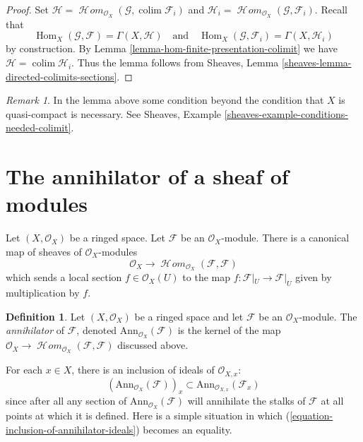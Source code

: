 \documentclass{stacks-project}
\theoremstyle{plain}
\theoremstyle{definition}
\newtheorem{definition}[subsection]{Definition}
\theoremstyle{remark}
\newtheorem{remark}[subsection]{Remark}
\numberwithin{equation}{subsection}
\def\colim{\mathop{\mathrm{colim}}\nolimits}
\def\Hom{\mathop{\mathrm{Hom}}\nolimits}
\def\SheafHom{\mathop{\mathcal{H}\!\mathit{om}}\nolimits}
\begin{document}
\begin{proof}
Set
$\mathcal{H} = \SheafHom_{\mathcal{O}_X}(\mathcal{G}, \colim \mathcal{F}_i)$
and $\mathcal{H}_i = \SheafHom_{\mathcal{O}_X}(\mathcal{G}, \mathcal{F}_i)$.
Recall that
$$
\Hom_X(\mathcal{G}, \mathcal{F}) = \Gamma(X, \mathcal{H})
\quad\text{and}\quad
\Hom_X(\mathcal{G}, \mathcal{F}_i) = \Gamma(X, \mathcal{H}_i)
$$
by construction. By Lemma \ref{lemma-hom-finite-presentation-colimit} we have
$\mathcal{H} = \colim \mathcal{H}_i$. Thus the lemma follows from
Sheaves, Lemma \ref{sheaves-lemma-directed-colimits-sections}.
\end{proof}

\begin{remark}
\label{remark-condition-necessary}
In the lemma above some condition beyond the condition that $X$
is quasi-compact is necessary. See
Sheaves, Example \ref{sheaves-example-conditions-needed-colimit}.
\end{remark}




\section{The annihilator of a sheaf of modules}
\label{section-annihilator}

\noindent
Let $(X, \mathcal{O}_X)$ be a ringed space.
Let $\mathcal{F}$ be an $\mathcal{O}_X$-module.
There is a canonical map of sheaves of $\mathcal{O}_X$-modules
$$
\mathcal{O}_X
\longrightarrow
\SheafHom_{\mathcal{O}_X}(\mathcal{F}, \mathcal{F})
$$
which sends a local section $f \in \mathcal{O}_X(U)$ to the map
$f : \mathcal{F}|_U \to \mathcal{F}|_U$ given by multiplication by $f$.

\begin{definition}
\label{definition-annihilator-sheaf}
Let $(X, \mathcal{O}_X)$ be a ringed space and let $\mathcal{F}$
be an $\mathcal{O}_X$-module. The {\it annihilator} of $\mathcal{F}$,
denoted $\text{Ann}_{\mathcal{O}_X}(\mathcal{F})$
is the kernel of the map
$\mathcal{O}_X \to \SheafHom_{\mathcal{O}_X}(\mathcal{F}, \mathcal{F})$
discussed above.
\end{definition}

\noindent
For each $x\in X$, there is an inclusion of ideals of $\mathcal{O}_{X, x}$:
\begin{equation}
\label{equation-inclusion-of-annihilator-ideals}
(\text{Ann}_{\mathcal{O}_X}(\mathcal{F}))_x
\subset
\text{Ann}_{\mathcal{O}_{X, x}}(\mathcal{F}_x)
\end{equation}
since after all any section of $\text{Ann}_{\mathcal{O}_X}(\mathcal{F})$
will annihilate the stalks of $\mathcal{F}$ at all points at which it is
defined. Here is a simple situation in which
(\ref{equation-inclusion-of-annihilator-ideals}) becomes an equality.
\end{document}
